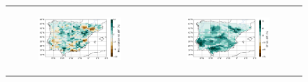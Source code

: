 \begin{figure}[htbp]
    \centering
    \begin{tabular}{cc}
        \begin{subfigure}[b]{0.5\textwidth}
            \caption{}
            \includegraphics[width=\textwidth]{images/chap4/future/reldiffmap_precip_futirr.png}
        \end{subfigure} &
        \begin{subfigure}[b]{0.5\textwidth}
            \caption{}
            \includegraphics[width=\textwidth]{images/chap4/future/reldiffmap_evap_futirr.png}
        \end{subfigure} \\


\end{tabular}
\end{figure}
